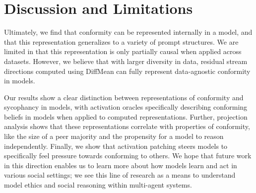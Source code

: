 \documentclass{article}
\begin{document}




\section{Discussion and Limitations}

Ultimately, we find that conformity can be represented internally in a model, and that this representation generalizes to a variety of prompt structures. We are limited in that this representation is only partially causal when applied across datasets. However, we believe that with larger diversity in data, residual stream directions computed using DiffMean can fully represent data-agnostic conformity in models.

Our results show a clear distinction between representations of conformity and sycophancy in models, with activation oracles specifically describing conforming beliefs in models when applied to computed representations. Further, projection analysis shows that these representations correlate with properties of conformity, like the size of a peer majority and the propensity for a model to reason independently. Finally, we show that activation patching steers models to specifically feel pressure towards conforming to others. We hope that future work in this direction enables us to learn more about how models learn and act in various social settings; we see this line of research as a means to understand model ethics and social reasoning within multi-agent systems. 

\newpage




\appendix
\end{document}
